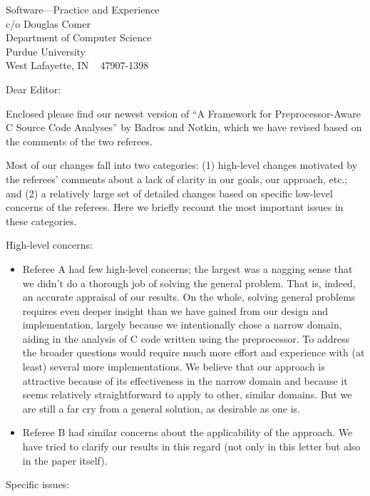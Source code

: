 \documentclass{letter}
\begin{document}
\begin{letter}{
Software---Practice and Experience \\
c/o Douglas Comer \\
Department of Computer Science \\
Purdue University \\
West Lafayette, IN ~ 47907-1398}

\opening{Dear Editor:}

Enclosed please find our newest version of ``A Framework for
Preprocessor-Aware C Source Code Analyses'' by Badros and Notkin, which we
have revised based on the comments of the two referees.

Most of our changes fall into two categories: (1) high-level changes
motivated by the referees' comments about a lack of clarity in our
goals, our approach, etc.; and (2) a relatively large set of detailed
changes based on specific low-level concerns of the referees.  Here we
briefly recount the most important issues in these categories.

High-level concerns:

\begin{itemize}

\item Referee A had few high-level concerns; the largest was a nagging
sense that we didn't do a thorough job of solving the general problem.  That
is, indeed, an accurate appraisal of our results.  On the whole, solving
general problems requires even deeper insight than we have gained from our
design and implementation, largely because we intentionally chose a narrow
domain, aiding in the analysis of C code written using the preprocessor.  To
address the broader questions would require much more effort and experience
with (at least) several more implementations.  We believe that our approach
is attractive because of its effectiveness in the narrow domain and because
it seems relatively straightforward to apply to other, similar domains.  But
we are still a far cry from a general solution, as desirable as one is.

\item Referee B had similar concerns about the applicability of the
approach.  We have tried to clarify our results in this regard (not only in
this letter but also in the paper itself).

\end{itemize}

\newpage{}
Specific issues:

\begin{itemize}


\end{itemize}
\end{letter}
\end{document}
